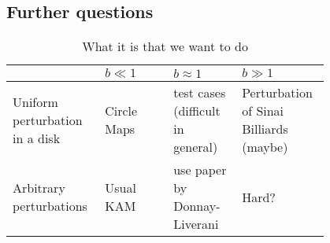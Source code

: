 \subsection{Further questions}

\begin{table}[!ht]
\centering
\renewcommand\arraystretch{2}
\begin{tabular}{>{\raggedright}p{0.2\linewidth}
				>{\raggedright}p{0.2\linewidth}
				>{\raggedright}p{0.2\linewidth}
				>{\raggedright\arraybackslash}p{0.2\linewidth}
                }
\toprule
 & $b\ll1$ & $b\approx1$ & $b\gg1$ \\
\midrule
Uniform perturbation in a disk 
  & Circle Maps 
  & test cases (difficult in general)
  & Perturbation of Sinai Billiards (maybe) \\
Arbitrary perturbations
  & Usual KAM
  & use paper by Donnay-Liverani
  & Hard?\\
\bottomrule
\end{tabular}
\caption{What it is that we want to do}
\label{tab:outline}
\end{table}